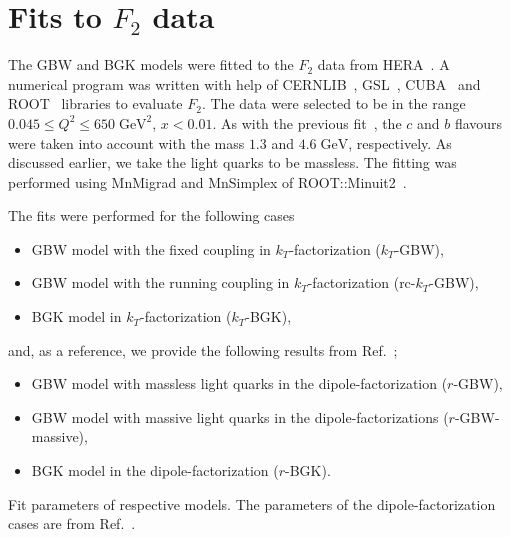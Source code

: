 \documentclass[11pt]{article}
\numberwithin{equation}{section}
\numberwithin{table}{section}
\numberwithin{figure}{section}
\begin{document}
\section{Fits to $F_2$ data}
\label{Results}

The GBW and BGK models were fitted to the $F_2$ data from HERA~\cite{Abt:2017nkc}. A numerical program was written with help of CERNLIB~\cite{Kolbig:1972zz}, GSL~\cite{GSL}, CUBA~\cite{Hahn:2004fe} and ROOT~\cite{Brun:1997pa} libraries to evaluate $F_2$. The data were selected to be in the range $0.045\leq Q^2\leq 650\;\mathrm{GeV^2}$, $x<0.01$.
As with the previous fit~\cite{Goda:2022wsc}, the $c$ and $b$ flavours were taken into account with the mass $1.3$ and $4.6\;\mathrm{GeV}$, respectively. As discussed earlier, we take the light quarks to be massless.
The fitting was performed using MnMigrad and MnSimplex of ROOT::Minuit2~\cite{James:2004xla}.

The fits were performed for the following cases
\begin{itemize}
\item GBW model with the fixed coupling in $k_T$-factorization  ($k_T$-GBW),
\item GBW model with the running coupling in $k_T$-factorization (rc-$k_T$-GBW),
\item BGK model in $k_T$-factorization ($k_T$-BGK),
\end{itemize} 
and, as a reference, we provide the following results from Ref.~\cite{Goda:2022wsc};
\begin{itemize}
\item GBW model with massless light quarks in the dipole-factorization ($r$-GBW),
\item GBW model with massive light quarks in the dipole-factorizations ($r$-GBW-massive),
\item  BGK model in  the dipole-factorization ($r$-BGK).
\end{itemize} 

\begin{table}[t]
\begin{subtable}{\textwidth}
\center\footnotesize

\vspace{2mm}
\end{subtable}
\begin{subtable}{\textwidth}
\center\footnotesize

\vspace{2mm}
\end{subtable}
\caption{Fit parameters of respective models. The parameters of the
dipole-factorization cases are from Ref.~\cite{Goda:2022wsc}.}
\label{tab:table}
\end{table}
\end{document}
